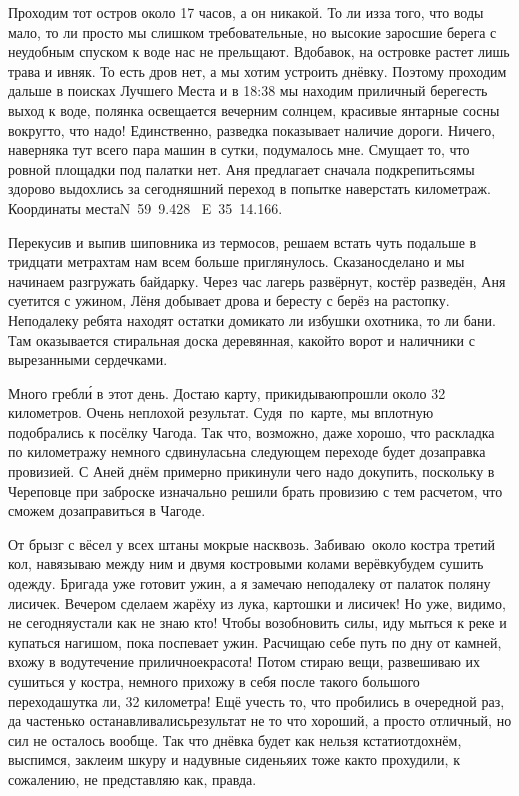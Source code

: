Проходим тот остров около 17 часов, а он никакой. То ли из\sdash за того, что воды мало, то ли просто мы слишком требовательные, но высокие заросшие берега с неудобным спуском к воде нас не прельщают. Вдобавок, на островке растет лишь трава и ивняк. То есть дров нет, а мы хотим устроить днёвку. Поэтому проходим дальше в поисках Лучшего Места и в 18:38 мы находим приличный берег\mdash есть выход к воде, полянка освещается вечерним солнцем, красивые янтарные сосны вокруг\mdash то, что надо! Единственно, разведка показывает наличие дороги. Ничего, наверняка тут всего пара машин в сутки, подумалось мне. Смущает то, что ровной площадки под палатки нет. Аня предлагает сначала подкрепиться\mdash мы здорово выдохлись за сегодняшний переход в попытке наверстать километраж. Координаты места\mdash N~59\degree~9.428\textprime~ E~35\degree~14.166\textprime.

Перекусив и выпив шиповника из термосов, решаем встать чуть подальше в тридцати метрах\mdash там нам всем больше приглянулось. Сказано\sdash сделано и мы начинаем разгружать байдарку. Через час лагерь развёрнут, костёр разведён, Аня суетится с ужином, Лёня добывает дрова и бересту с берёз на растопку. Неподалеку ребята находят остатки домика\mdash то ли избушки охотника, то ли бани. Там оказывается стиральная доска деревянная, какой\sdash то ворот и наличники с вырезанными сердечками. 

Много гребл\'{и} в этот день. Достаю карту, прикидываю\mdash прошли около 32 километров. Очень неплохой результат. Судя~по~карте, мы вплотную подобрались к посёлку Чагода. Так что, возможно, даже хорошо, что раскладка по километражу немного сдвинулась\mdash на следующем переходе будет дозаправка провизией. С Аней днём примерно прикинули чего надо докупить, поскольку в Череповце при заброске изначально решили брать провизию с тем расчетом, что сможем дозаправиться в Чагоде.

От брызг с вёсел у всех штаны мокрые насквозь. Забиваю~около костра третий кол, навязываю между ним и двумя костровыми колами верёвку\mdash будем сушить одежду. Бригада уже готовит ужин, а я замечаю неподалеку от палаток поляну лисичек. Вечером сделаем жарёху из лука, картошки и лисичек! Но уже, видимо, не сегодня\mdash устали как не знаю кто! Чтобы возобновить силы, иду мыться к реке и купаться нагишом, пока поспевает ужин. Расчищаю себе путь по дну от камней, вхожу в воду\mdash течение приличное\mdash красота! Потом стираю вещи, развешиваю их сушиться у костра, немного прихожу в себя после такого большого перехода\mdash шутка ли, 32 километра! Ещё учесть то, что пробились в очередной раз, да частенько останавливались\mdash результат не то что хороший, а просто отличный, но сил не осталось вообще. Так что днёвка будет как нельзя кстати\mdash отдохнём, выспимся, заклеим шкуру и надувные сиденья\mdash их тоже как\sdash то прохудили, к сожалению, не представляю как, правда. 

